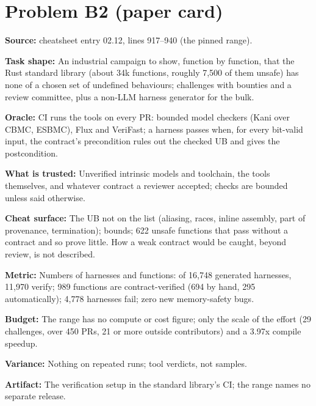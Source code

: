 \documentclass[11pt]{article}
\begin{document}
\section*{Problem B2 (paper card)}\label{ans:B2}
\begin{answer}
\textbf{Source:} cheatsheet entry 02.12, lines 917--940 (the pinned range).

\textbf{Task shape:} An industrial campaign to show, function by function,
that the Rust standard library (about 34k functions, roughly 7,500 of them
unsafe) has none of a chosen set of undefined behaviours; challenges with
bounties and a review committee, plus a non-LLM harness generator for the
bulk.

\textbf{Oracle:} CI runs the tools on every PR: bounded model checkers (Kani
over CBMC, ESBMC), Flux and VeriFast; a harness passes when, for every
bit-valid input, the contract's precondition rules out the checked UB and
gives the postcondition.

\textbf{What is trusted:} Unverified intrinsic models and toolchain, the
tools themselves, and whatever contract a reviewer accepted; checks are
bounded unless said otherwise.

\textbf{Cheat surface:} The UB not on the list (aliasing, races, inline
assembly, part of provenance, termination); bounds; 622 unsafe functions
that pass without a contract and so prove little. How a weak contract would
be caught, beyond review, is not described.

\textbf{Metric:} Numbers of harnesses and functions: of 16,748 generated
harnesses, 11,970 verify; 989 functions are contract-verified (694 by hand,
295 automatically); 4,778 harnesses fail; zero new memory-safety bugs.

\textbf{Budget:} The range has no compute or cost figure; only the scale of
the effort (29 challenges, over 450 PRs, 21 or more outside contributors) and
a 3.97x compile speedup.

\textbf{Variance:} Nothing on repeated runs; tool verdicts, not samples.

\textbf{Artifact:} The verification setup in the standard library's CI; the
range names no separate release.
\end{answer}
\end{document}
